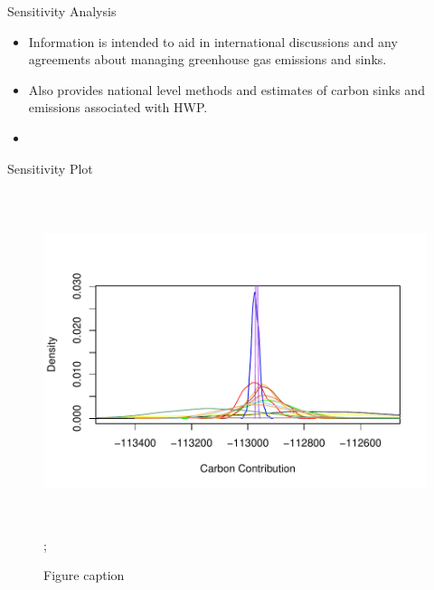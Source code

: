 \documentclass[final]{beamer}\usepackage[]{graphicx}\usepackage[]{color}
\newlength{\onecolwid}
\begin{document}
\begin{frame}[t]
\begin{columns}[t]
\begin{column}{\onecolwid}
\begin{block}{Sensitivity Analysis}
\begin{itemize}
\item Information is intended to aid in international discussions and any agreements about managing greenhouse gas emissions and sinks.
\item Also provides national level methods and estimates of carbon sinks and emissions associated with HWP.
\item 
\end{itemize}
\vspace{0ex}

\end{block}

\begin{block}{Sensitivity Plot}
\begin{center}
\begin{figure}
    {\includegraphics[width=1\linewidth,height=10cm]{CopyOfHLSensitivityGraph.pdf}};
    \caption{Figure caption}
\end{figure}
\end{center}
\end{block}




\end{column}
\end{columns}
\end{frame}
\end{document}
